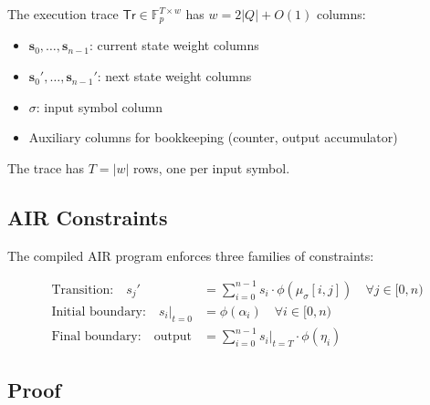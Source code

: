 \documentclass[11pt]{article}
\newcommand{\F}{\mathbb{F}}
\newcommand{\Tr}{\textsf{Tr}}
\begin{document}
The execution trace $\Tr \in \F_p^{T \times w}$ has $w = 2|Q| + O(1)$
columns:
\begin{itemize}[nosep]
\item $\mathbf{s}_0, \ldots, \mathbf{s}_{n-1}$: current state weight columns
\item $\mathbf{s}_0', \ldots, \mathbf{s}_{n-1}'$: next state weight columns
\item $\sigma$: input symbol column
\item Auxiliary columns for bookkeeping (counter, output accumulator)
\end{itemize}
The trace has $T = |w|$ rows, one per input symbol.

\subsection{AIR Constraints}

The compiled AIR program enforces three families of constraints:

\begin{align}
  \text{Transition:}\quad s_j' &= \sum_{i=0}^{n-1} s_i \cdot \phi(\mu_\sigma[i,j])
    \quad \forall j \in [0,n) \label{eq:transition} \\
  \text{Initial boundary:}\quad s_i\big|_{t=0} &= \phi(\alpha_i)
    \quad \forall i \in [0,n) \label{eq:boundary-init} \\
  \text{Final boundary:}\quad \text{output} &= \sum_{i=0}^{n-1}
    s_i\big|_{t=T} \cdot \phi(\eta_i) \label{eq:boundary-final}
\end{align}

\subsection{Proof}
\end{document}
